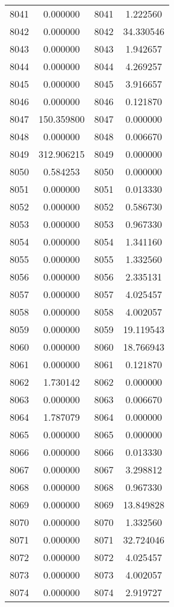 \documentclass[12pt]{article}
\begin{document}
\begin{longtable}{@{}cccc@{}}
8041 & 0.000000 & 8041 & 1.222560 \\
8042 & 0.000000 & 8042 & 34.330546 \\
8043 & 0.000000 & 8043 & 1.942657 \\
8044 & 0.000000 & 8044 & 4.269257 \\
8045 & 0.000000 & 8045 & 3.916657 \\
8046 & 0.000000 & 8046 & 0.121870 \\
8047 & 150.359800 & 8047 & 0.000000 \\
8048 & 0.000000 & 8048 & 0.006670 \\
8049 & 312.906215 & 8049 & 0.000000 \\
8050 & 0.584253 & 8050 & 0.000000 \\
8051 & 0.000000 & 8051 & 0.013330 \\
8052 & 0.000000 & 8052 & 0.586730 \\
8053 & 0.000000 & 8053 & 0.967330 \\
8054 & 0.000000 & 8054 & 1.341160 \\
8055 & 0.000000 & 8055 & 1.332560 \\
8056 & 0.000000 & 8056 & 2.335131 \\
8057 & 0.000000 & 8057 & 4.025457 \\
8058 & 0.000000 & 8058 & 4.002057 \\
8059 & 0.000000 & 8059 & 19.119543 \\
8060 & 0.000000 & 8060 & 18.766943 \\
8061 & 0.000000 & 8061 & 0.121870 \\
8062 & 1.730142 & 8062 & 0.000000 \\
8063 & 0.000000 & 8063 & 0.006670 \\
8064 & 1.787079 & 8064 & 0.000000 \\
8065 & 0.000000 & 8065 & 0.000000 \\
8066 & 0.000000 & 8066 & 0.013330 \\
8067 & 0.000000 & 8067 & 3.298812 \\
8068 & 0.000000 & 8068 & 0.967330 \\
8069 & 0.000000 & 8069 & 13.849828 \\
8070 & 0.000000 & 8070 & 1.332560 \\
8071 & 0.000000 & 8071 & 32.724046 \\
8072 & 0.000000 & 8072 & 4.025457 \\
8073 & 0.000000 & 8073 & 4.002057 \\
8074 & 0.000000 & 8074 & 2.919727 \\

\end{longtable}
\end{document}
